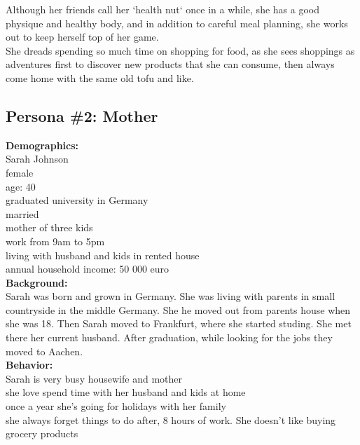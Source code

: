 \documentclass[a4paper,10pt,oneside]{scrreprt}
\begin{document}
\begin{mdframed}
\begin{minipage}{\textwidth}
				
				
				Although her friends call her `health nut` once in a while, she has a good physique and healthy body, and in addition to careful meal planning, she works out to keep herself top of her game.\\
				
				She dreads spending so much time on shopping for food, as she sees shoppings as adventures first to discover new products that she can consume, then always come home with the same old tofu and like.\\
			\end{minipage}
		\end{mdframed}
	
		\subsection{Persona \#2: Mother}
		
		\textbf{Demographics:}\\
				Sarah Johnson\\
				female\\
				age: 40\\
				graduated university in Germany\\
				married\\
				mother of three kids\\
				work from 9am to 5pm\\
				living with husband and kids in rented house\\
				annual household income: 50 000 euro\\
				
		\textbf{Background:}\\
				Sarah was born and grown in Germany. She was living with parents in small countryside in the middle Germany. She he moved out from parents house when she was 18. Then Sarah moved to Frankfurt, where she started studing. She met there her current husband. After graduation, while looking for the jobs they moved to Aachen.\\
				
		\textbf{Behavior:}\\
				Sarah is very busy housewife and mother\\
				she love spend time with her husband and kids at home\\
				once a year she's going for holidays with her family\\
				she always forget things to do after, 8 hours of work. She doesn't like buying grocery products\\
				
\end{document}
